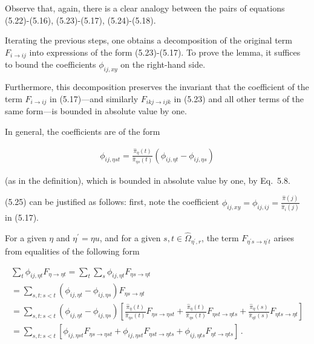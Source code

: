 Observe that, again, there is a clear analogy between the pairs of equations (5.22)-(5.16), (5.23)-(5.17), (5.24)-(5.18).\par




Iterating the previous steps, one obtains a decomposition of the original term $F_{i\rightarrow ij}$ into expressions of the form (5.23)-(5.17). To prove the lemma, it suffices to bound the coefficients $\phi_{ij,xy}$ on the right-hand side.\par




Furthermore, this decomposition preserves the invariant that the coefficient of the term $F_{i\rightarrow ij}$ in (5.17)—and similarly $F_{ikj\rightarrow ijk}$ in (5.23) and all other terms of the same form—is bounded in absolute value by one.\par




In general, the coefficients are of the form\par


\[\begin{gathered}
\phi_{ij,\eta st}=\frac{\hat{\pi}_{\eta}(t)}{\hat{\pi}_{\eta s}(t)}(\phi_{ij,\eta t}-\phi_{ij,\eta s})
\end{gathered}\]


(as in the definition)\thinspace{},
which is bounded in absolute value by one, by Eq. 5.8.\par




(5.25) can be justified as follows: first, note the coefficient $\phi_{ij,xy}=\phi_{ij,ij}=\frac{\hat{\pi}(j)}{\hat{\pi}_{i}(j)}$ in (5.17).\par




For a given $\eta$ and $\eta^{\prime}=\eta u$, and for a given $s,t\in\hat{\Omega}_{\eta^{\prime},r}$, the term $F_{\eta^{\prime}s\rightarrow\eta^{\prime}t}$ arises from equalities of the following form\par




\[\begin{gathered}
\displaystyle\sum_{t}\phi_{ij,\eta t}F_{\eta\rightarrow\eta t} \displaystyle=\sum_{t}\sum_{s}\phi_{ij,\eta t}F_{\eta s\rightarrow\eta t} \\
\displaystyle=\sum_{s,t:s<t}(\phi_{ij,\eta t}-\phi_{ij,\eta s})F_{\eta s\rightarrow\eta t} \\
\displaystyle=\sum_{s,t:s<t}(\phi_{ij,\eta t}-\phi_{ij,\eta s})\left[\frac{\hat{\pi}_{\eta}(t)}{\hat{\pi}_{\eta s}(t)}F_{\eta s\rightarrow\eta st}+\frac{\hat{\pi}_{\eta}(t)}{\hat{\pi}_{\eta s}(t)}F_{\eta st\rightarrow\eta ts}+\frac{\hat{\pi}_{\eta}(s)}{\hat{\pi}_{\eta t}(s)}F_{\eta ts\rightarrow\eta t}\right] \\
\displaystyle=\sum_{s,t:s<t}\left[\phi_{ij,\eta st}F_{\eta s\rightarrow\eta st}+\phi_{ij,\eta st}F_{\eta st\rightarrow\eta ts}+\phi_{ij,\eta ts}F_{\eta t\rightarrow\eta ts}\right]\,.
\end{gathered}\]




